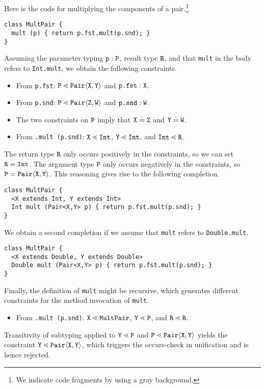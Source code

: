 Here is the \TFGJ code  for multiplying the components of a
pair.\footnote{We indicate \TFGJ code fragments by using a
  {gray background}.}
\begin{lstlisting}[style=tfgj]
class MultPair {
  mult (p) { return p.fst.mult(p.snd); }
}
\end{lstlisting}
Assuming the parameter typing ${\tt p}:{\tt P}$, result type ${\tt R}$, and that
\texttt{mult} in the body refers to \texttt{Int.mult}, we
obtain the following constraints.
\begin{itemize}
\item From \texttt{p.fst}: ${\tt P} \lessdot \mathtt{Pair}\langle{\tt X},{\tt Y}\rangle$ and
  $\texttt{p.fst} : {\tt X}$.
\item From \texttt{p.snd}: ${\tt P} \lessdot \mathtt{Pair}\langle{\tt Z},{\tt W}\rangle$ and
  $\texttt{p.snd} : {\tt W}$.
\item The two constraints on ${\tt P}$ imply that ${\tt X} \doteq {\tt Z}$ and
  ${\tt Y} \doteq {\tt W}$.
\item From \texttt{.mult (p.snd)}: ${\tt X} \lessdot \mathtt{Int}$, ${\tt Y} \lessdot
  \mathtt{Int}$, and $\mathtt{Int} \lessdot {\tt R}$.
\end{itemize}
The return type ${\tt R}$ only occurs positively in the constraints, so we can
set ${\tt R} = \mathtt{Int}$.
The argument type ${\tt P}$ only occurs negatively in the constraints,
so ${\tt P} = \mathtt{Pair} \langle{\tt X},{\tt Y}\rangle$.
This reasoning gives rise to the following completion.
\begin{lstlisting}[style=fgj]
class MultPair {
  <X extends Int, Y extends Int>
  Int mult (Pair<X,Y> p) { return p.fst.mult(p.snd); }
}
\end{lstlisting}
We obtain a second completion if we assume that \texttt{mult} refers to
\texttt{Double.mult}.
\begin{lstlisting}[style=fgj]
class MultPair {
  <X extends Double, Y extends Double>
  Double mult (Pair<X,Y> p) { return p.fst.mult(p.snd); }
}
\end{lstlisting}

Finally, the definition of \texttt{mult} might be recursive, which
generates different constraints for the method invocation of \texttt{mult}.
\begin{itemize}
\item From \texttt{.mult (p.snd)}: ${\tt X} \lessdot \mathtt{MultPair}$, ${\tt Y} \lessdot
  \mathtt{P}$, and $\mathtt{R} \lessdot {\tt R}$.
\end{itemize}
Transitivity of subtyping applied to ${\tt Y} \lessdot \mathtt{P}$ and ${\tt P} \lessdot \mathtt{Pair}\langle{\tt X},{\tt Y}\rangle$
yields the constraint ${\tt Y} \lessdot \mathtt{Pair}\langle{\tt X},{\tt Y}\rangle$, which triggers the
occurs-check in unification and is hence rejected. 


